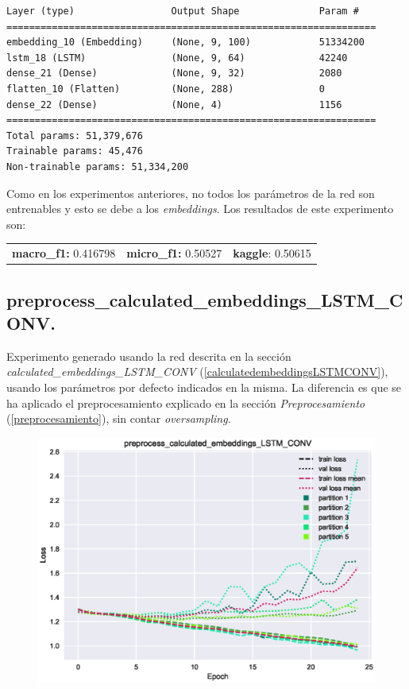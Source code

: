 \documentclass[11pt]{article}
\begin{document}
\begin{verbatim}
Layer (type)                 Output Shape              Param #   
=================================================================
embedding_10 (Embedding)     (None, 9, 100)            51334200  
lstm_18 (LSTM)               (None, 9, 64)             42240     
dense_21 (Dense)             (None, 9, 32)             2080      
flatten_10 (Flatten)         (None, 288)               0         
dense_22 (Dense)             (None, 4)                 1156      
=================================================================
Total params: 51,379,676
Trainable params: 45,476
Non-trainable params: 51,334,200
\end{verbatim}

Como en los experimentos anteriores, no todos los parámetros de la red son entrenables y esto se debe a los \textit{embeddings}. Los resultados de este experimento son: 

\begin{table}[H]
\begin{tabular}{c|c|c}
\textbf{macro\_f1:} 0.416798 & \textbf{micro\_f1:} 0.50527 & \textbf{kaggle}: 0.50615
\end{tabular}
\end{table}

\subsection{preprocess\_calculated\_embeddings\_LSTM\_CONV.} \label{exp_preprocesscalculatedembeddingsLSTMCONV}

Experimento generado usando la red descrita en la sección \textit{calculated\_embeddings\_LSTM\_CONV} (\ref{calculatedembeddingsLSTMCONV}), usando los parámetros por defecto indicados en la misma. La diferencia es que se ha aplicado el preprocesamiento explicado en la sección \textit{Preprocesamiento} (\ref{preprocesamiento}), sin contar \textit{oversampling}.

\begin{figure}[H]
\includegraphics[width=\linewidth]{images/loss/preprocess_calculated_embeddings_LSTM_CONV-1554208275.eps}
\end{figure}
\end{document}
